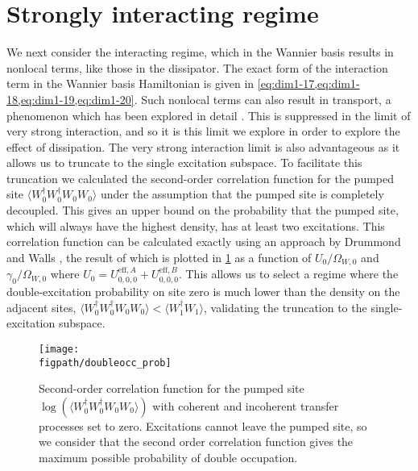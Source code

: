 \section{Strongly interacting regime}
We next consider the interacting regime, which in the Wannier basis results in nonlocal terms, like those in the dissipator. The exact form of the interaction term in the Wannier basis Hamiltonian is given in \cref{eq:dim1-17,eq:dim1-18,eq:dim1-19,eq:dim1-20}. Such nonlocal terms can also result in transport, a phenomenon which has been explored in detail \cite{Huber2010,Tovmasyan2013,Takayoshi2013,Phillips2015,Pudleiner2015}. This is suppressed in the limit of very strong interaction, and so it is this limit we explore in order to explore the effect of dissipation. The very strong interaction limit is also advantageous as it allows us to truncate to the single excitation subspace. To facilitate this truncation we calculated the second-order correlation function for the pumped site \(\langle W_{0}^{\dagger}W_{0}^{\dagger}W_{0}W_{0} \rangle\) under the assumption that the pumped site is completely decoupled. This gives an upper bound on the probability that the pumped site, which will always have the highest density, has at least two excitations. This correlation function can be calculated exactly using an approach by Drummond and Walls \cite{Drummond1980,LeBoite2013}, the result of which is plotted in \cref{fig:dim3-1} as a function of \(U_{0}/\Omega_{W,0}\) and \(\gamma_{0}/\Omega_{W,0}\) where \(U_{0} = U_{0,0,0}^{\mathrm{eff},A} + U_{0,0,0}^{\mathrm{eff},B}\). This allows us to select a regime where the double-excitation probability on site zero is much lower than the density on the adjacent sites, \(\langle W_{0}^{\dagger}W_{0}^{\dagger}W_{0}W_{0} \rangle < \langle W_{1}^{\dagger}W_{1} \rangle\), validating the truncation to the single-excitation subspace.

\begin{figure}[ht!]
\centering
\texttt{[image: \\figpath/doubleocc\_prob]}
\caption{\label{fig:dim3-1}Second-order correlation function for the pumped site \(\log(\langle W_{0}^{\dagger}W_{0}^{\dagger}W_{0}W_{0}\rangle )\) with coherent and incoherent transfer processes set to zero. Excitations cannot leave the pumped site, so we consider that the second order correlation function gives the maximum possible probability of double occupation.}
\end{figure}

